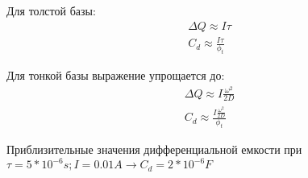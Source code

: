 Для толстой базы:
\begin{eqnarray}
\Delta Q \approx I \tau \\
C_d \approx \frac{I \tau}{\phi_t}
\end{eqnarray}

Для тонкой базы выражение упрощается до:
\begin{eqnarray}
\Delta Q \approx I \frac{\omega^2}{2 D}\\
C_d \approx \frac{I  \frac{\omega^2}{2 D}}{\phi_t}
\end{eqnarray}

Приблизительные значения дифференциальной емкости при $\tau = 5*10^{-6}s ; I = 0.01 A \longrightarrow C_d = 2 *10^{-6} F$

\pagebreak
